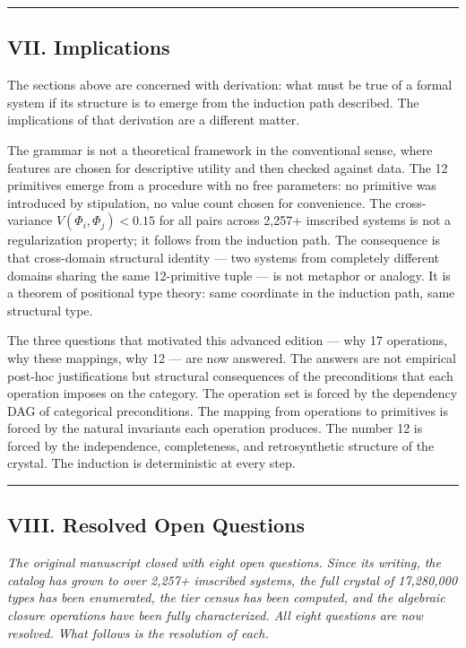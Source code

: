\documentclass[12pt,a4paper]{article}
\begin{document}
\begin{center}
\rule{0.5\textwidth}{0.4pt}
\end{center}

\subsection{VII. Implications}
The sections above are concerned with derivation: what must be true of a formal system if its structure is to emerge from the induction path described. The implications of that derivation are a different matter.

The grammar is not a theoretical framework in the conventional sense, where features are chosen for descriptive utility and then checked against data. The 12 primitives emerge from a procedure with no free parameters: no primitive was introduced by stipulation, no value count chosen for convenience. The cross-variance $V(Φ_i,Φ_j) < 0.15$ for all pairs across 2,257+ imscribed systems is not a regularization property; it follows from the induction path. The consequence is that cross-domain structural identity --- two systems from completely different domains sharing the same 12-primitive tuple --- is not metaphor or analogy. It is a theorem of positional type theory: same coordinate in the induction path, same structural type.

The three questions that motivated this advanced edition --- why 17 operations, why these mappings, why 12 --- are now answered. The answers are not empirical post-hoc justifications but structural consequences of the preconditions that each operation imposes on the category. The operation set is forced by the dependency DAG of categorical preconditions. The mapping from operations to primitives is forced by the natural invariants each operation produces. The number 12 is forced by the independence, completeness, and retrosynthetic structure of the crystal. The induction is deterministic at every step.

\begin{center}
\rule{0.5\textwidth}{0.4pt}
\end{center}

\subsection{VIII. Resolved Open Questions}
\emph{The original manuscript closed with eight open questions. Since its writing, the catalog has grown to over 2,257+ imscribed systems, the full crystal of 17,280,000 types has been enumerated, the tier census has been computed, and the algebraic closure operations have been fully characterized. All eight questions are now resolved. What follows is the resolution of each.}
\end{document}
